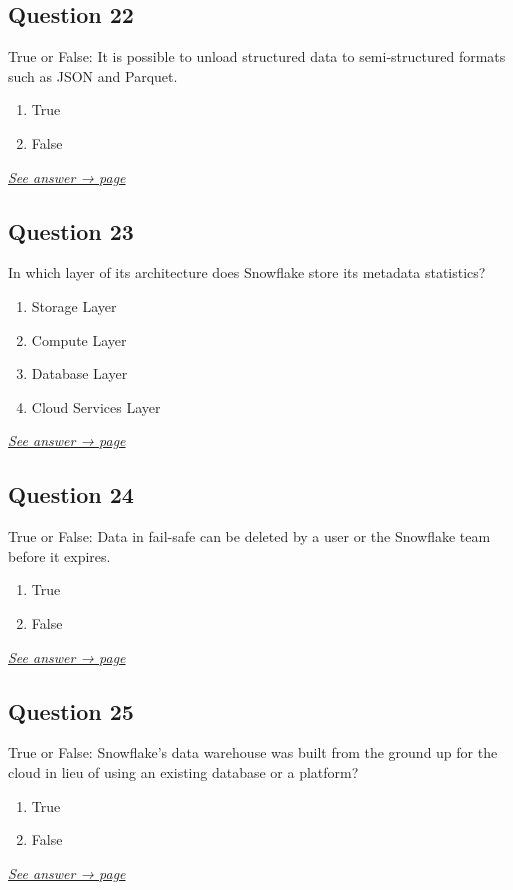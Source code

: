 \documentclass[12pt]{article}
\newcommand{\seeanswer}[1]{%
  \par\smallskip\emph{\hyperref[ans:#1]{See answer → page \pageref{ans:#1}}}%
}
\begin{document}
\subsection*{Question 22}\label{q:22}
True or False: It is possible to unload structured data to semi-structured formats such as JSON and Parquet.

\begin{enumerate}[label=\Alph*.]
  \item True
  \item False
\end{enumerate}
\seeanswer{22}

\subsection*{Question 23}\label{q:23}
In which layer of its architecture does Snowflake store its metadata statistics?

\begin{enumerate}[label=\Alph*.]
  \item Storage Layer
  \item Compute Layer
  \item Database Layer
  \item Cloud Services Layer
\end{enumerate}
\seeanswer{23}

\subsection*{Question 24}\label{q:24}
True or False: Data in fail-safe can be deleted by a user or the Snowflake team before it expires.

\begin{enumerate}[label=\Alph*.]
  \item True
  \item False
\end{enumerate}
\seeanswer{24}

\subsection*{Question 25}\label{q:25}
True or False: Snowflake's data warehouse was built from the ground up for the cloud in lieu of using an existing database or a platform?

\begin{enumerate}[label=\Alph*.]
  \item True
  \item False
\end{enumerate}
\seeanswer{25}
\end{document}
